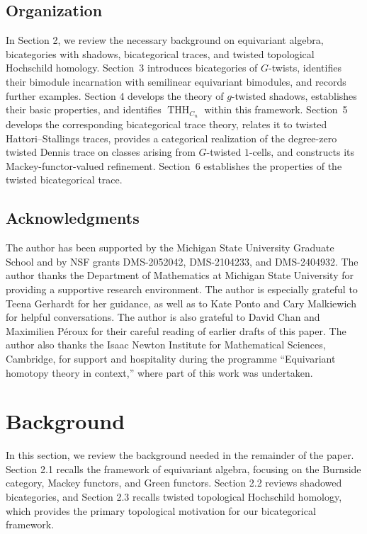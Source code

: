 \documentclass[11pt,oneside]{amsart}
\DeclareMathOperator{\THH}{THH}
\numberwithin{equation}{section}
\numberwithin{figure}{section}
\theoremstyle{plain}
\theoremstyle{definition}
\theoremstyle{remark}
\begin{document}
 \subsection*{Organization}
In Section 2, we review the necessary background on equivariant algebra, bicategories with shadows, bicategorical traces, and twisted topological Hochschild homology.  Section~3 introduces bicategories of \(G\)-twists, identifies their
bimodule incarnation with semilinear equivariant bimodules, and records
further examples. Section 4 develops the theory of \(g\)-twisted shadows, establishes their basic properties, and identifies \(\THH_{C_n}\) within this framework. Section~5 develops the corresponding bicategorical trace theory, relates it to twisted Hattori--Stallings traces, provides a categorical realization of the degree-zero twisted Dennis trace on classes
arising from \(G\)-twisted \(1\)-cells, and constructs its Mackey-functor-valued   refinement. Section~6 establishes the properties of the twisted bicategorical trace. 

 
 


\subsection*{Acknowledgments}
The author has been supported by the Michigan State University Graduate School and by NSF grants DMS-2052042, DMS-2104233, and DMS-2404932. The author thanks the Department of Mathematics at Michigan State University for providing a supportive research environment. The author is especially grateful to Teena Gerhardt for her guidance, as well as to Kate Ponto and Cary Malkiewich for helpful conversations. The author is also grateful to David Chan and Maximilien Péroux for their careful reading of earlier drafts of this paper. The author also thanks the Isaac Newton Institute for Mathematical Sciences, Cambridge, for support and hospitality during the programme “Equivariant homotopy theory in context,” where part of this work was undertaken.


\section{Background}
In this section, we review the background needed in the remainder of the paper. Section 2.1 recalls the framework of equivariant algebra, focusing on the Burnside category, Mackey functors, and Green functors. Section 2.2 reviews shadowed bicategories, and Section 2.3 recalls twisted topological Hochschild homology, which provides the primary topological motivation for our bicategorical framework.
\end{document}
